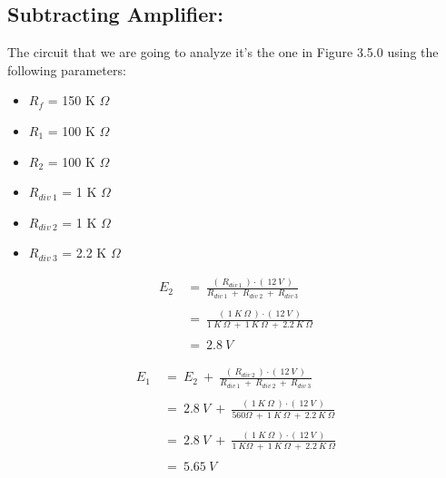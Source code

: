 \subsection{Subtracting Amplifier:}

The circuit that we are going to analyze it's the one in Figure 3.5.0 using the following parameters: \hfill \break

{\bfseries
\begin{itemize}
\item $R_{f}$ = 150 K $\Omega$
\item $R_{1}$ = 100 K $\Omega$
\item $R_{2}$ = 100 K $\Omega$
\item $R_{div\ 1}$ = 1 K $\Omega$
\item $R_{div\ 2}$ = 1 K $\Omega$
\item $R_{div\ 3}$ = 2.2 K $\Omega$
\end{itemize}} \hfill

{\bfseries\itshape{}} 

\begin{flushright}
{\bfseries\itshape{}} \hfill \break
\end{flushright}

\begin{ceqn}
\begin{align*}
E_{2}\ &=\ \frac{(\ R_{div\ 1}\ ) \cdot (\ 12\ V\ )}{R_{div\ 1}\ +\ R_{div\ 2}\ +\ R_{div\ 3}} \\ \\
&=\ \frac{(\ 1\ K\ \Omega\ ) \cdot (\ 12\ V\ )}{1\ K\ \Omega\ +\ 1\ K\ \Omega\ +\ 2.2\ K\ \Omega} \\ \\
&=\ 2.8\ V
\end{align*}
\end{ceqn} \hfill \break

{\bfseries\itshape{}} 

\begin{ceqn}
\begin{align*}
E_{1}\ &=\ E_{2}\ +\ \frac{(\ R_{div\ 2}\ ) \cdot (\ 12\ V\ )}{R_{div\ 1}\ +\ R_{div\ 2}\ +\ R_{div\ 3}} \\ \\
&=\ 2.8\ V\ +\ \frac{(\ 1\ K\ \Omega\ ) \cdot (\ 12\ V\ )}{560 \Omega\ +\ 1\ K\ \Omega\ +\ 2.2\ K\ \Omega} \\ \\
&=\ 2.8\ V\ +\ \frac{(\ 1\ K\ \Omega\ ) \cdot (\ 12\ V\ )}{1\ K \Omega\ +\ 1\ K\ \Omega\ +\ 2.2\ K\ \Omega} \\ \\
&=\ 5.65\ V
\end{align*}
\end{ceqn} \hfill \break


